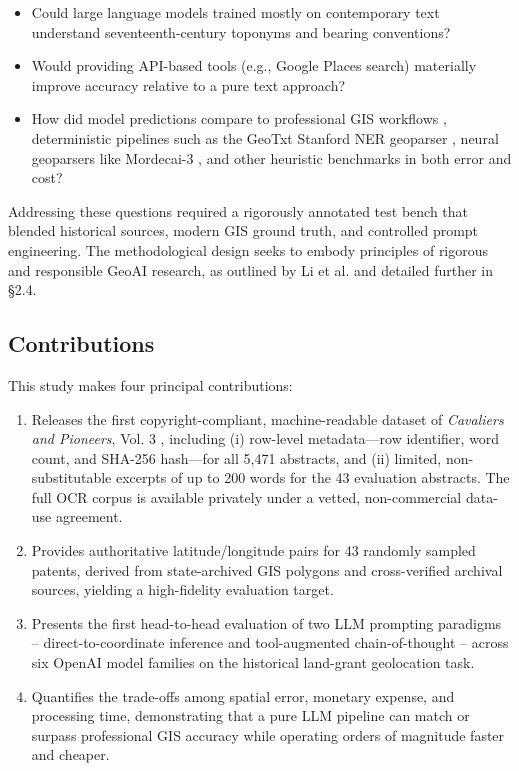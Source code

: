 \begin{itemize}
\tightlist
\item
  Could large language models trained mostly on contemporary text
  understand seventeenth-century toponyms and bearing conventions?
\item
  Would providing API-based tools (e.g., Google Places search)
  materially improve accuracy relative to a pure text approach?
\item
  How did model predictions compare to professional GIS workflows
  \citep{Bashorun2025_gis}, deterministic pipelines such as the GeoTxt
  Stanford NER geoparser \citep{karimzadeh2019geotxt}, neural geoparsers
  like Mordecai-3 \citep{halterman2023mordecai}, and other heuristic
  benchmarks in both error and cost?
\end{itemize}

Addressing these questions required a rigorously annotated test bench
that blended historical sources, modern GIS ground truth, and controlled
prompt engineering. The methodological design seeks to embody principles
of rigorous and responsible GeoAI research, as outlined by Li et al.
\citep{Li2024_geoai} and detailed further in §2.4.

\subsection{Contributions}\label{contributions}

This study makes four principal contributions:

\begin{enumerate}
\def\labelenumi{\arabic{enumi}.}
\tightlist
\item
  Releases the first copyright-compliant, machine-readable dataset of
  \emph{Cavaliers and Pioneers}, Vol. 3 \citep{Nugent1979_cavaliers3},
  including (i) row-level metadata---row identifier, word count, and
  SHA-256 hash---for all 5,471 abstracts, and (ii) limited,
  non-substitutable excerpts of up to 200 words for the 43 evaluation
  abstracts. The full OCR corpus is available privately under a vetted,
  non-commercial data-use agreement.
\item
  Provides authoritative latitude/longitude pairs for 43 randomly
  sampled patents, derived from state-archived GIS polygons and
  cross-verified archival sources, yielding a high-fidelity evaluation
  target.
\item
  Presents the first head-to-head evaluation of two LLM prompting
  paradigms -- direct-to-coordinate inference and tool-augmented
  chain-of-thought -- across six OpenAI model families on the historical
  land-grant geolocation task.
\item
  Quantifies the trade-offs among spatial error, monetary expense, and
  processing time, demonstrating that a pure LLM pipeline can match or
  surpass professional GIS accuracy while operating orders of magnitude
  faster and cheaper.
\end{enumerate}

